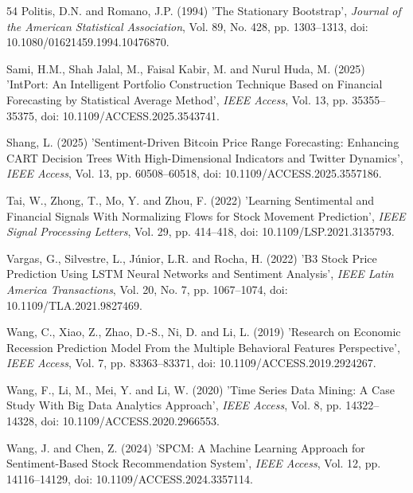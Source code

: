 \begin{thebibliography}{54}
Politis, D.N. and Romano, J.P. (1994) 'The Stationary Bootstrap', {\it Journal of the American Statistical Association}, Vol. 89, No. 428, pp. 1303--1313, doi: 10.1080/01621459.1994.10476870.

Sami, H.M., Shah Jalal, M., Faisal Kabir, M. and Nurul Huda, M. (2025) 'IntPort: An Intelligent Portfolio Construction Technique Based on Financial Forecasting by Statistical Average Method', {\it IEEE Access}, Vol. 13, pp. 35355--35375, doi: 10.1109/ACCESS.2025.3543741.

Shang, L. (2025) 'Sentiment-Driven Bitcoin Price Range Forecasting: Enhancing CART Decision Trees With High-Dimensional Indicators and Twitter Dynamics', {\it IEEE Access}, Vol. 13, pp. 60508--60518, doi: 10.1109/ACCESS.2025.3557186.

Tai, W., Zhong, T., Mo, Y. and Zhou, F. (2022) 'Learning Sentimental and Financial Signals With Normalizing Flows for Stock Movement Prediction', {\it IEEE Signal Processing Letters}, Vol. 29, pp. 414--418, doi: 10.1109/LSP.2021.3135793.

Vargas, G., Silvestre, L., J\'unior, L.R. and Rocha, H. (2022) 'B3 Stock Price Prediction Using LSTM Neural Networks and Sentiment Analysis', {\it IEEE Latin America Transactions}, Vol. 20, No. 7, pp. 1067--1074, doi: 10.1109/TLA.2021.9827469.

Wang, C., Xiao, Z., Zhao, D.-S., Ni, D. and Li, L. (2019) 'Research on Economic Recession Prediction Model From the Multiple Behavioral Features Perspective', {\it IEEE Access}, Vol. 7, pp. 83363--83371, doi: 10.1109/ACCESS.2019.2924267.

Wang, F., Li, M., Mei, Y. and Li, W. (2020) 'Time Series Data Mining: A Case Study With Big Data Analytics Approach', {\it IEEE Access}, Vol. 8, pp. 14322--14328, doi: 10.1109/ACCESS.2020.2966553.

Wang, J. and Chen, Z. (2024) 'SPCM: A Machine Learning Approach for Sentiment-Based Stock Recommendation System', {\it IEEE Access}, Vol. 12, pp. 14116--14129, doi: 10.1109/ACCESS.2024.3357114.


\end{thebibliography}
